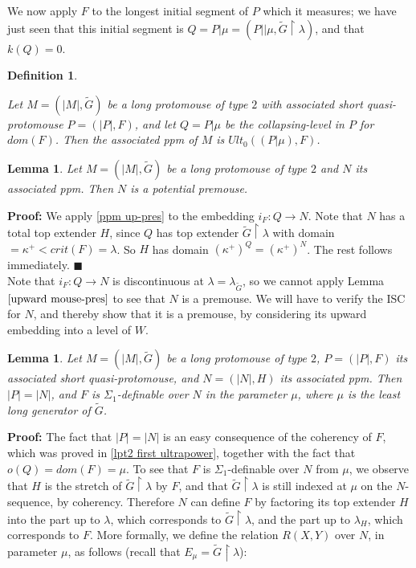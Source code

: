 \documentclass[12pt]{article}
\newtheorem{lem}[thm]{Lemma}
\newtheorem{defn}[thm]{Definition}
\begin{document}
We now apply $F$ to the longest initial segment of $P$ which it measures; we have just seen that this initial segment is $Q = P | \mu = (P || \mu , \tilde{G} \restriction \lambda )$, and that $k(Q) = 0$.\\

\begin{defn} \label{associated ppm type 2}

Let $M = (|M|, \tilde{G} )$ be a long protomouse of type $2$ with associated short quasi-protomouse $P = ( |P|, F )$, and let $Q = P | \mu$ be the collapsing-level in $P$ for $dom (F)$.  Then the associated ppm of $M$ is $Ult_0 ((P | \mu ) , F)$.
\end{defn}

\begin{lem} \label{double unmorph is a ppm}
Let $M = (|M|, \tilde{G} )$ be a long protomouse of type $2$ and $N$ its associated ppm.  Then $N$ is a potential premouse.
\end{lem}

\textbf{Proof:}  We apply \ref{ppm up-pres} to the embedding $i_F : Q \longrightarrow N$.  Note that $N$ has a total top extender $H$, since $Q$ has top extender $\tilde{G} \restriction \lambda$ with domain $= \kappa^+ < crit (F) = \lambda$.  So $H$ has domain $(\kappa^+)^Q = (\kappa^+ )^N$.  The rest follows immediately. $\blacksquare$\\

Note that $ i_F : Q \longrightarrow N$ is discontinuous at $\lambda = \lambda_{\tilde{G}}$, so we cannot apply Lemma $\ref{upward mouse-pres}$ to see that $N$ is a premouse.  We will have to verify the ISC for $N$, and thereby show that it is a premouse, by considering its upward embedding into a level of $W$.\\

\begin{lem} \label{type 2 simulation of F}
Let $M = (|M|, \tilde{G} )$ be a long protomouse of type $2$, $P = ( |P|, F )$ its associated short quasi-protomouse, and $N = ( |N| , H )$ its associated ppm.  Then $|P| = |N|$, and $F$ is $\Sigma_1$-definable over $N$ in the parameter $\mu$, where $\mu$ is the least long generator of $\tilde{G}$.
\end{lem}

\textbf{Proof:}  The fact that $|P| = |N|$ is an easy consequence of the coherency of $F$, which was proved in \ref{lpt2 first ultrapower}, together with the fact that $o(Q) = dom(F) = \mu$.  To see that $F$ is $\Sigma_1$-definable over $N$ from $\mu$, we observe that $H$ is the stretch of $\tilde{G} \restriction \lambda$ by $F$, and that $\tilde{G} \restriction \lambda$ is still indexed at $\mu$ on the $N$-sequence, by coherency.  Therefore $N$ can define $F$ by factoring its top extender $H$ into the part up to $\lambda$, which corresponds to $\tilde{G} \restriction \lambda$, and the part up to $\lambda_H$, which corresponds to $F$.  More formally, we define the relation $R ( X, Y )$ over $N$, in parameter $\mu$, as follows (recall that $E_\mu = \tilde{G} \restriction \lambda$):
\end{document}
